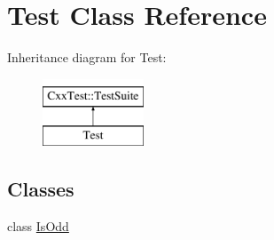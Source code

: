 \hypertarget{classTest}{\section{Test Class Reference}
\label{classTest}
}
Inheritance diagram for Test\-:\begin{figure}[H]
\begin{center}
\leavevmode
\includegraphics[height=2.000000cm]{classTest}
\end{center}
\end{figure}
\subsection*{Classes}
\begin{DoxyCompactItemize}
\item 
class \hyperlink{classTest_1_1IsOdd}{Is\-Odd}
\end{DoxyCompactItemize}
